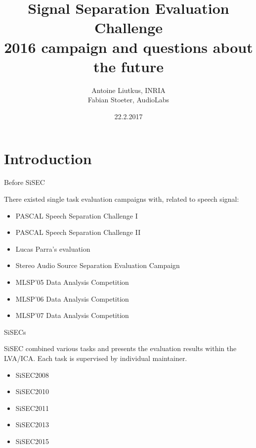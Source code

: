 \documentclass{beamer}
\title[SISEC 2.0]{Signal Separation Evaluation Challenge\\2016 campaign and questions about the future}
\author{Antoine Liutkus, INRIA\\ Fabian Stoeter, AudioLabs}
\date{22.2.2017}
\begin{document}
\begin{frame}
  \titlepage
\end{frame}


\section{Introduction}

\begin{frame}{Before SiSEC}

There existed single task evaluation campaigns with, related to speech
signal:

\begin{itemize}

\item
  PASCAL Speech Separation Challenge I
\item
  PASCAL Speech Separation Challenge II
\item
  Lucas Parra's evaluation
\item
  Stereo Audio Source Separation Evaluation Campaign
\item
  MLSP'05 Data Analysis Competition
\item
  MLSP'06 Data Analysis Competition
\item
  MLSP'07 Data Analysis Competition
\end{itemize}

\end{frame}

\begin{frame}{SiSECs}

SiSEC combined various tasks and presents the evaluation results within
the LVA/ICA. Each task is supervised by individual maintainer.

\begin{itemize}

\item
  SiSEC2008
\item
  SiSEC2010
\item
  SiSEC2011
\item
  SiSEC2013
\item
  SiSEC2015
\end{itemize}

\end{frame}
\end{document}
